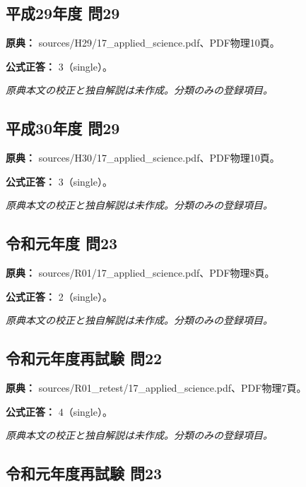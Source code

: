\subsection{平成29年度 問29}
\label{q:h29-reg-applied-29}

\noindent\textbf{原典：} sources/H29/17\_applied\_science.pdf、PDF物理10頁。

\textbf{公式正答：} 3（single）。

\par\textit{原典本文の校正と独自解説は未作成。分類のみの登録項目。}

\subsection{平成30年度 問29}
\label{q:h30-reg-applied-29}

\noindent\textbf{原典：} sources/H30/17\_applied\_science.pdf、PDF物理10頁。

\textbf{公式正答：} 3（single）。

\par\textit{原典本文の校正と独自解説は未作成。分類のみの登録項目。}

\subsection{令和元年度 問23}
\label{q:r01-reg-applied-23}

\noindent\textbf{原典：} sources/R01/17\_applied\_science.pdf、PDF物理8頁。

\textbf{公式正答：} 2（single）。

\par\textit{原典本文の校正と独自解説は未作成。分類のみの登録項目。}

\subsection{令和元年度再試験 問22}
\label{q:r01-ret-applied-22}

\noindent\textbf{原典：} sources/R01\_retest/17\_applied\_science.pdf、PDF物理7頁。

\textbf{公式正答：} 4（single）。

\par\textit{原典本文の校正と独自解説は未作成。分類のみの登録項目。}

\subsection{令和元年度再試験 問23}
\label{q:r01-ret-applied-23}

